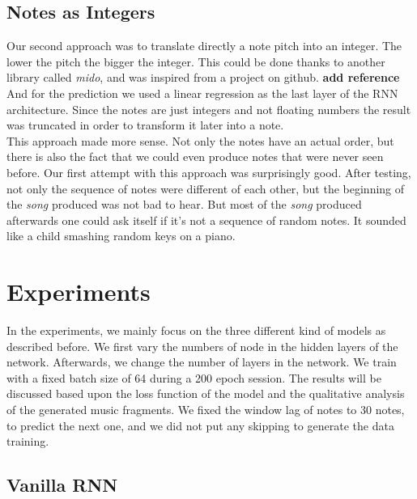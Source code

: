 \documentclass[11pt]
{article}
\begin{document}
\subsection{Notes as Integers}
Our second approach was to translate directly a note pitch into an integer. 
The lower the pitch the bigger the integer.
This could be done thanks to another library called \textit{mido}, and was inspired from a project on github. \textbf{ add reference}\\
And for the prediction we used a linear regression as the last layer of the RNN architecture. 
Since the notes are just integers and not floating numbers the result was truncated in order to transform it later into a note.\\
This approach made more sense.
Not only the notes have an actual order, but there is also the fact that we could even produce notes that were never seen before.
Our first attempt with this approach was surprisingly good.
After testing, not only the sequence of notes were different of each other, but the beginning of the \textit{song} produced was not bad to hear.
But most of the \textit{song} produced afterwards one could ask itself if it's not a sequence of random notes.
It sounded like a child smashing random keys on a piano.


\section{Experiments}
In the experiments, we mainly focus on the three different kind of models as described before. We first vary the numbers of node in the hidden layers of the network. Afterwards, we change the number of layers in the network. We train with a fixed batch size of 64 during a 200 epoch session. The results will be discussed based upon the loss function of the model and the qualitative analysis of the generated music fragments. We fixed the window lag of notes to 30 notes, to predict the next one, and we did not put any skipping to generate the data training.


\subsection{Vanilla RNN}
\end{document}
